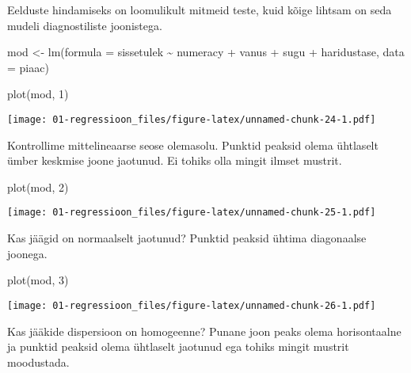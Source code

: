 \documentclass[
]{book}
\newenvironment{Shaded}{\begin{snugshade}}{\end{snugshade}}
\newcommand{\AttributeTok}[1]{\textcolor[rgb]{0.77,0.63,0.00}{#1}}
\newcommand{\DecValTok}[1]{\textcolor[rgb]{0.00,0.00,0.81}{#1}}
\newcommand{\FunctionTok}[1]{\textcolor[rgb]{0.00,0.00,0.00}{#1}}
\newcommand{\NormalTok}[1]{#1}
\newcommand{\OtherTok}[1]{\textcolor[rgb]{0.56,0.35,0.01}{#1}}
\newcommand{\SpecialCharTok}[1]{\textcolor[rgb]{0.00,0.00,0.00}{#1}}
\begin{document}
Eelduste hindamiseks on loomulikult mitmeid teste, kuid kõige lihtsam on seda mudeli diagnostiliste joonistega.

\begin{Shaded}
\begin{Highlighting}[]
\NormalTok{mod }\OtherTok{\textless{}{-}} \FunctionTok{lm}\NormalTok{(}\AttributeTok{formula =}\NormalTok{ sissetulek }\SpecialCharTok{\textasciitilde{}}\NormalTok{ numeracy }\SpecialCharTok{+}\NormalTok{ vanus }\SpecialCharTok{+}\NormalTok{ sugu }\SpecialCharTok{+}\NormalTok{ haridustase, }
    \AttributeTok{data =}\NormalTok{ piaac)}
\end{Highlighting}
\end{Shaded}

\begin{Shaded}
\begin{Highlighting}[]
\FunctionTok{plot}\NormalTok{(mod, }\DecValTok{1}\NormalTok{)}
\end{Highlighting}
\end{Shaded}

\texttt{[image: 01-regressioon\_files/figure-latex/unnamed-chunk-24-1.pdf]}

Kontrollime mittelineaarse seose olemasolu. Punktid peaksid olema ühtlaselt ümber keskmise joone jaotunud. Ei tohiks olla mingit ilmset mustrit.

\begin{Shaded}
\begin{Highlighting}[]
\FunctionTok{plot}\NormalTok{(mod, }\DecValTok{2}\NormalTok{)}
\end{Highlighting}
\end{Shaded}

\texttt{[image: 01-regressioon\_files/figure-latex/unnamed-chunk-25-1.pdf]}

Kas jäägid on normaalselt jaotunud? Punktid peaksid ühtima diagonaalse joonega.

\begin{Shaded}
\begin{Highlighting}[]
\FunctionTok{plot}\NormalTok{(mod, }\DecValTok{3}\NormalTok{)}
\end{Highlighting}
\end{Shaded}

\texttt{[image: 01-regressioon\_files/figure-latex/unnamed-chunk-26-1.pdf]}

Kas jääkide dispersioon on homogeenne? Punane joon peaks olema horisontaalne ja punktid peaksid olema ühtlaselt jaotunud ega tohiks mingit mustrit moodustada.
\end{document}
